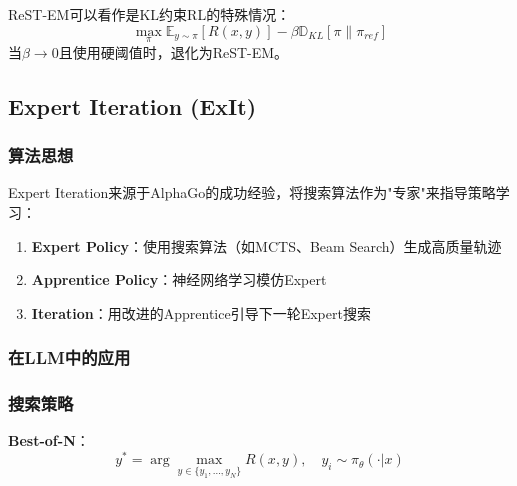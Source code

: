 \documentclass[12pt,a4paper]{article}
\newenvironment{algorithmic}[1][]%
      {\begin{list}{}{\leftmargin=2em\itemsep=0.2em\parsep=0pt\topsep=0.2em}}%
      {\end{list}}
\newcommand{\STATE}{\item[]}
\newcommand{\FOR}[1]{\item[]\textbf{for} ##1 \textbf{do}}
\newcommand{\ENDFOR}{\item[]\textbf{end for}}
\begin{document}
ReST-EM可以看作是KL约束RL的特殊情况：
\begin{equation}
\max_\pi \mathbb{E}_{y \sim \pi}[R(x,y)] - \beta \mathbb{D}_{KL}[\pi \| \pi_{ref}]
\end{equation}
当$\beta \rightarrow 0$且使用硬阈值时，退化为ReST-EM。

\subsection{Expert Iteration (ExIt)}

\subsubsection{算法思想}

Expert Iteration来源于AlphaGo的成功经验，将搜索算法作为"专家"来指导策略学习：

\begin{enumerate}
    \item \textbf{Expert Policy}：使用搜索算法（如MCTS、Beam Search）生成高质量轨迹
    \item \textbf{Apprentice Policy}：神经网络学习模仿Expert
    \item \textbf{Iteration}：用改进的Apprentice引导下一轮Expert搜索
\end{enumerate}

\subsubsection{在LLM中的应用}


\subsubsection{搜索策略}

\textbf{Best-of-N}：
\begin{equation}
y^* = \arg\max_{y \in \{y_1, \ldots, y_N\}} R(x, y), \quad y_i \sim \pi_\theta(\cdot|x)
\end{equation}
\end{document}
